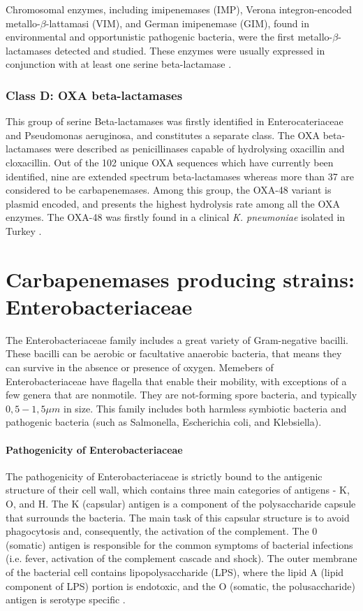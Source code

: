\documentclass[11pt]{report}
\begin{document}
Chromosomal enzymes, including imipenemases (IMP), Verona integron-encoded metallo-$\beta$-lattamasi (VIM), and German imipenemase (GIM), found in environmental and opportunistic pathogenic bacteria, were the first metallo-$\beta$-lactamases detected and studied.
These enzymes were usually expressed in conjunction with at least one serine beta-lactamase \cite{Queenan2007}.

\subsection{Class D: OXA beta-lactamases}
This group of serine Beta-lactamases was firstly identified in Enterocateriaceae and Pseudomonas aeruginosa, and constitutes a separate class.
The OXA beta-lactamases were described as penicillinases capable of hydrolysing oxacillin and cloxacillin.
Out of the 102 unique OXA sequences which have currently been identified, nine are extended spectrum beta-lactamases whereas more than 37 are considered to be carbapenemases.
Among this group, the OXA-48 variant is plasmid encoded, and presents the highest hydrolysis rate among all the OXA enzymes.
The OXA-48 was firstly found in a clinical \emph{K. pneumoniae} isolated in Turkey \cite{Poirel2012}.

\chapter{Carbapenemases producing strains: Enterobacteriaceae}
The Enterobacteriaceae family includes a great variety of Gram-negative bacilli.
These bacilli can be aerobic or facultative anaerobic bacteria, that means they can survive in the absence or presence of oxygen.
Memebers of Enterobacteriaceae have flagella that enable their mobility, with exceptions of a few genera that are nonmotile.
They are not-forming spore bacteria, and typically $0,5-1,5\mu m$ in size.
This family includes both harmless symbiotic bacteria and pathogenic bacteria (such as Salmonella, Escherichia coli, and Klebsiella).

\subsubsection{Pathogenicity of Enterobacteriaceae}

The pathogenicity of Enterobacteriaceae is strictly bound to the antigenic structure of their cell wall, which contains three main categories of antigens - K, O, and H.
The K (capsular) antigen is a component of the polysaccharide capsule that surrounds the bacteria.
The main task of this capsular structure is to avoid phagocytosis and, consequently, the activation of the complement.
The 0 (somatic) antigen is responsible for the common symptoms of bacterial infections (i.e. fever, activation of the complement cascade and shock).
The outer membrane of the bacterial cell contains lipopolysaccharide (LPS), where the lipid A (lipid component of LPS) portion is endotoxic, and the O (somatic, the polusaccharide) antigen is serotype specific \cite{guentzel1996escherichia}.
\end{document}
